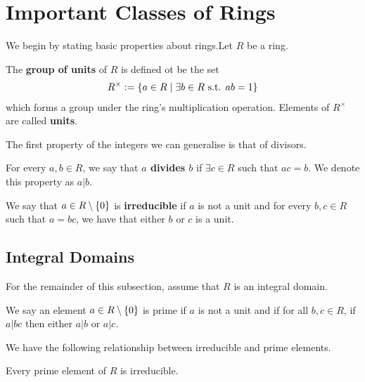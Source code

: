 \section{Important Classes of Rings}

We begin by stating basic properties about rings.Let $R$ be a ring.

\begin{boxdefinition}
    The \textbf{group of units} of $R$ is defined ot be the set
    \begin{align*}
        R^{\times} := \left\{ a \in R \; \middle\vert \; \exists b \in R \text{ s.t. } ab = 1 \right\}
    \end{align*}
    which forms a group under the ring's multiplication operation. Elements of $R^{\times}$ are called \textbf{units}.
\end{boxdefinition}

The first property of the integers we can generalise is that of divisors.

\begin{boxdefinition}
    For every $a, b \in R$, we say that \textbf{$a$ divides $b$} if $\exists c \in R$ such that $ac = b$. We denote this property as $a \vert b$.
\end{boxdefinition}

\begin{boxdefinition}[Irreducibility]
    We say that $a \in R \setminus \left\{ 0 \right\}$ is \textbf{irreducible} if $a$ is not a unit and for every $b, c \in R$ such that $a = bc$, we have that either $b$ or $c$ is a unit.
\end{boxdefinition}

\subsection{Integral Domains}

For the remainder of this subsection, assume that $R$ is an integral domain.

\begin{boxdefinition}
    We say an element $a \in R \setminus \left\{ 0 \right\}$ is prime if $a$ is not a unit and if for all $b, c \in R$, if $a \vert bc$ then either $a \vert b$ or $a \vert c$.
\end{boxdefinition}

We have the following relationship between irreducible and prime elements.

\begin{boxlemma}\label{Ch2:Lemma:PrimeIrred}
    Every prime element of $R$ is irreducible.
\end{boxlemma}

